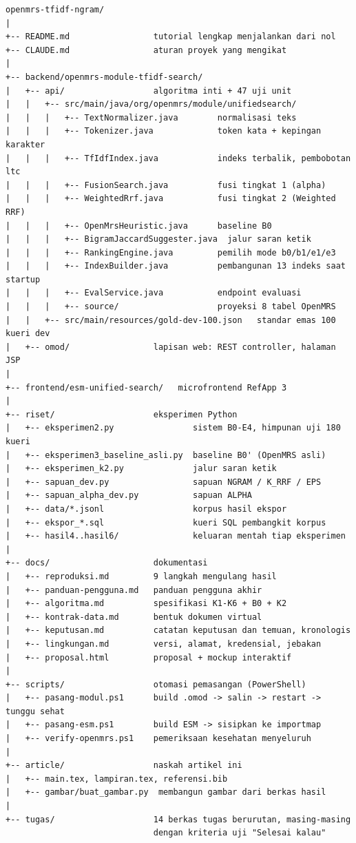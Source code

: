 \begin{verbatim}
openmrs-tfidf-ngram/
|
+-- README.md                 tutorial lengkap menjalankan dari nol
+-- CLAUDE.md                 aturan proyek yang mengikat
|
+-- backend/openmrs-module-tfidf-search/
|   +-- api/                  algoritma inti + 47 uji unit
|   |   +-- src/main/java/org/openmrs/module/unifiedsearch/
|   |   |   +-- TextNormalizer.java        normalisasi teks
|   |   |   +-- Tokenizer.java             token kata + kepingan karakter
|   |   |   +-- TfIdfIndex.java            indeks terbalik, pembobotan ltc
|   |   |   +-- FusionSearch.java          fusi tingkat 1 (alpha)
|   |   |   +-- WeightedRrf.java           fusi tingkat 2 (Weighted RRF)
|   |   |   +-- OpenMrsHeuristic.java      baseline B0
|   |   |   +-- BigramJaccardSuggester.java  jalur saran ketik
|   |   |   +-- RankingEngine.java         pemilih mode b0/b1/e1/e3
|   |   |   +-- IndexBuilder.java          pembangunan 13 indeks saat startup
|   |   |   +-- EvalService.java           endpoint evaluasi
|   |   |   +-- source/                    proyeksi 8 tabel OpenMRS
|   |   +-- src/main/resources/gold-dev-100.json   standar emas 100 kueri dev
|   +-- omod/                 lapisan web: REST controller, halaman JSP
|
+-- frontend/esm-unified-search/   microfrontend RefApp 3
|
+-- riset/                    eksperimen Python
|   +-- eksperimen2.py                sistem B0-E4, himpunan uji 180 kueri
|   +-- eksperimen3_baseline_asli.py  baseline B0' (OpenMRS asli)
|   +-- eksperimen_k2.py              jalur saran ketik
|   +-- sapuan_dev.py                 sapuan NGRAM / K_RRF / EPS
|   +-- sapuan_alpha_dev.py           sapuan ALPHA
|   +-- data/*.jsonl                  korpus hasil ekspor
|   +-- ekspor_*.sql                  kueri SQL pembangkit korpus
|   +-- hasil4..hasil6/               keluaran mentah tiap eksperimen
|
+-- docs/                     dokumentasi
|   +-- reproduksi.md         9 langkah mengulang hasil
|   +-- panduan-pengguna.md   panduan pengguna akhir
|   +-- algoritma.md          spesifikasi K1-K6 + B0 + K2
|   +-- kontrak-data.md       bentuk dokumen virtual
|   +-- keputusan.md          catatan keputusan dan temuan, kronologis
|   +-- lingkungan.md         versi, alamat, kredensial, jebakan
|   +-- proposal.html         proposal + mockup interaktif
|
+-- scripts/                  otomasi pemasangan (PowerShell)
|   +-- pasang-modul.ps1      build .omod -> salin -> restart -> tunggu sehat
|   +-- pasang-esm.ps1        build ESM -> sisipkan ke importmap
|   +-- verify-openmrs.ps1    pemeriksaan kesehatan menyeluruh
|
+-- article/                  naskah artikel ini
|   +-- main.tex, lampiran.tex, referensi.bib
|   +-- gambar/buat_gambar.py  membangun gambar dari berkas hasil
|
+-- tugas/                    14 berkas tugas berurutan, masing-masing
                              dengan kriteria uji "Selesai kalau"
\end{verbatim}

